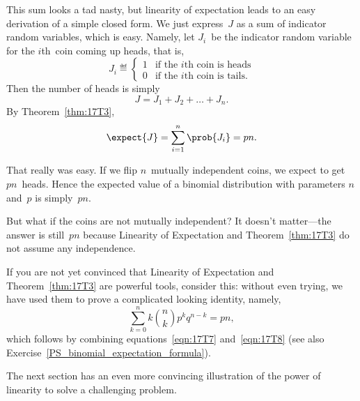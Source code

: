 \iffalse
\begin{align}
\expect{J}
    &= \sum_{k = 0}^n k \prob{J = k} \notag\\
    &= \sum_{k = 0}^n k \binom{n}{k} p^k q^{n - k}. \label{eqn:17T7}
\end{align}
\fi

This sum looks a tad nasty, but linearity of expectation leads to an
easy derivation of a simple closed form.  We just express~$J$ as a sum
of indicator random variables, which is easy.  Namely, let $J_i$~be
the indicator random variable for the $i$th~coin coming up heads, that
is,
\begin{equation*}
J_i \eqdef \begin{cases}
        1 & \text{if the $i$th coin is heads} \\
        0 & \text{if the $i$th coin is tails}.
      \end{cases}
\end{equation*}
Then the number of heads is simply
\begin{equation*}
    J = J_1 + J_2 + \dots + J_n.
\end{equation*}
By Theorem~\ref{thm:17T3},
\begin{equation}\label{eqn:17T8}
\expect{J} = \sum_{i = 1}^n \prob{J_i} = pn. 
\end{equation}

That really was easy.  If we flip $n$~mutually independent coins, we
expect to get $pn$~heads.  Hence the expected value of a binomial
distribution with parameters $n$ and~$p$ is simply~$pn$.

But what if the coins are not mutually independent?  It doesn't
matter---the answer is still~$p n$ because Linearity of Expectation
and Theorem~\ref{thm:17T3} do not assume any independence.

If you are not yet convinced that Linearity of Expectation and
Theorem~\ref{thm:17T3} are powerful tools, consider this: without even
trying, we have used them to prove a complicated looking identity,
namely,
\begin{equation}\label{binomial-expectsum}
    \sum_{k = 0}^n k \binom{n}{k} p^k q^{n - k} = p n,
\end{equation}
which follows by combining equations~\eqref{eqn:17T7}
and~\eqref{eqn:17T8} (see also
Exercise~\ref{PS_binomial_expectation_formula}).

The next section has an even more convincing illustration of the power
of linearity to solve a challenging problem.

